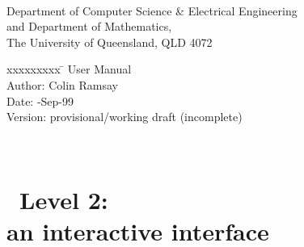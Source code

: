 \documentclass[12pt,a4paper,twoside]{report}
\begin{document}
\pagestyle{empty}

\begin{center}\large
{} \\[2.0ex]
Department of Computer Science {\normalsize\&} Electrical Engineering \\
and Department of Mathematics, \\
The University of Queensland, QLD 4072
\end{center}

\vspace*{3.5in}

\begin{center}\large
{\parbox{75mm}{\begin{tabbing}
xxxxxxxxx \= \kill
         \> {\ace} User Manual\\[0.75ex]
Author:  \> Colin Ramsay \\
Date:    -Sep-99 \\
Version: \> provisional/working draft (incomplete)
\end{tabbing}}}
\end{center}


\newpage
\pagestyle{plain}
\setcounter{page}{2}

\ 


\newpage

\tableofcontents


\newpage
\setcounter{page}{1}


\chapter{\ace\ Level 2: \\ an interactive interface}



\clearpage




\end{document}
